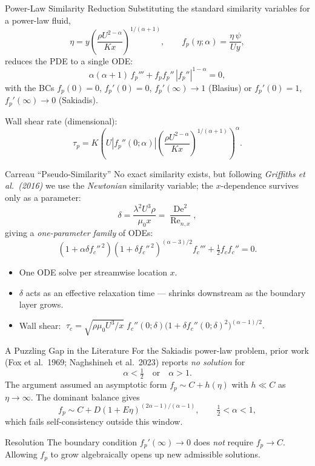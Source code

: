 \documentclass[10pt,aspectratio=169]{beamer}
\renewcommand{\Re}{\operatorname{Re}}
\newcommand{\De}{\operatorname{De}}
\newcommand{\Renx}{\Re_{n,x}}
\begin{document}
\begin{frame}{Power-Law Similarity Reduction}
  Substituting the standard similarity variables for a power-law fluid,
  \[
    \eta = y\!\left(\frac{\rho U^{2-\alpha}}{Kx}\right)^{\!1/(\alpha+1)}\!,\qquad
    f_p(\eta;\alpha) = \frac{\eta\,\psi}{Uy},
  \]
  reduces the PDE to a single ODE:
  \[
    \alpha(\alpha+1)\,f_p''' + f_p f_p''\,|f_p''|^{1-\alpha} = 0,
  \]
  with the BCs $f_p(0)=0$, $f_p'(0)=0$, $f_p'(\infty)\to1$ (Blasius) or
  $f_p'(0)=1$, $f_p'(\infty)\to0$ (Sakiadis).
  \vspace{0.4em}

  Wall shear rate (dimensional):
  \[
    \tau_p = K\!\left(U|f_p''(0;\alpha)|\!\left(\frac{\rho U^{2-\alpha}}{Kx}\right)^{\!1/(\alpha+1)}\right)^{\!\alpha}.
  \]
\end{frame}

\begin{frame}{Carreau ``Pseudo-Similarity''}
  No exact similarity exists, but following \emph{Griffiths et al.\ (2016)} we use the \emph{Newtonian}
  similarity variable; the $x$-dependence survives only as a parameter:
  \[
    \delta = \frac{\lambda^2 U^3 \rho}{\mu_0 x} = \frac{\De^2}{\Renx},
  \]
  giving a \emph{one-parameter family} of ODEs:
  \[
    \left(1+\alpha\delta f_c''^{\,2}\right)\!\left(1+\delta f_c''^{\,2}\right)^{\!(\alpha-3)/2} f_c''' + \tfrac{1}{2}f_c f_c'' = 0.
  \]
  \begin{itemize}
    \item One ODE solve per streamwise location $x$.
    \item $\delta$ acts as an effective relaxation time --- shrinks downstream as the boundary layer grows.
    \item Wall shear: $\;\tau_c = \sqrt{\rho\mu_0 U^3/x}\;f_c''(0;\delta)\bigl(1+\delta f_c''(0;\delta)^2\bigr)^{(\alpha-1)/2}.$
  \end{itemize}
\end{frame}

\begin{frame}{A Puzzling Gap in the Literature}
  For the Sakiadis power-law problem, prior work (Fox et al.\ 1969; Naghshineh et al.\ 2023)
  reports \emph{no solution} for
  \[
    \alpha < \tfrac{1}{2}\quad\text{or}\quad \alpha > 1.
  \]
  The argument assumed an asymptotic form $f_p \sim C + h(\eta)$ with $h\ll C$ as $\eta\to\infty$.
  The dominant balance gives
  \[
    f_p \sim C + D(1+E\eta)^{(2\alpha-1)/(\alpha-1)},\qquad \tfrac{1}{2}<\alpha<1,
  \]
  which fails self-consistency outside this window.
  \vspace{0.6em}

  \begin{block}{Resolution}
    The boundary condition $f_p'(\infty)\to 0$ does \emph{not} require $f_p\to C$.
    Allowing $f_p$ to grow algebraically opens up new admissible solutions.
  \end{block}
\end{frame}
\end{document}

